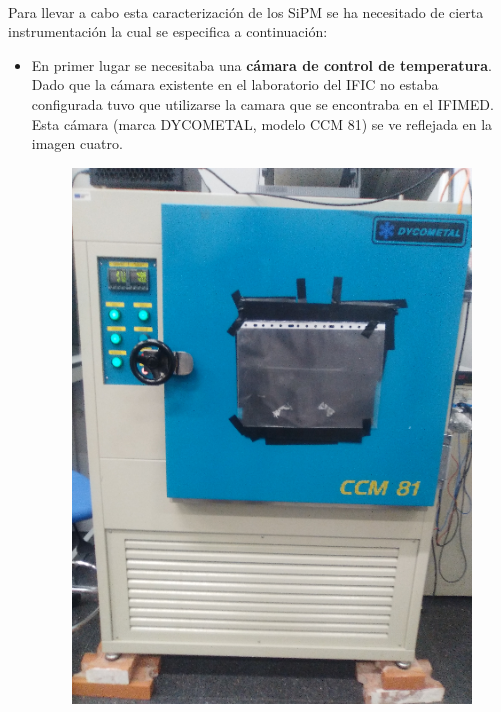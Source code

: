 \documentclass[11pt, a4paper]{article}
\begin{document}
\paragraph {} 
Para llevar a cabo esta caracterización de los SiPM se ha necesitado de cierta instrumentación la cual se especifica a continuación:

\begin{itemize}
\item {} En primer lugar se necesitaba una \textbf{cámara de control de temperatura}. 
\newline
Dado que la cámara existente en el laboratorio del IFIC no estaba configurada tuvo que utilizarse la camara que se encontraba en el IFIMED. Esta cámara (marca DYCOMETAL, modelo CCM 81) se ve reflejada en la imagen cuatro.

\begin{figure}[htb]
\centering
{
\includegraphics[scale=0.15]{SistemaTemperatura.png} 
}
{
}
\end{figure}
\end{itemize}
\end{document}
